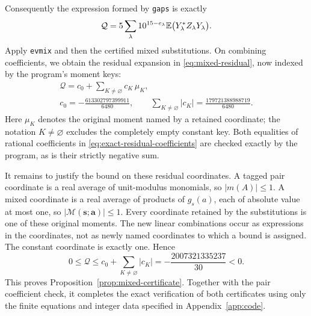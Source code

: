 Consequently the expression formed by \texttt{gaps} is exactly
\[
 \mathcal Q=
 5\sum_\lambda 10^{15-e_\lambda}
       \mathbb E\bigl(Y_\lambda^*Z_\lambda Y_\lambda\bigr).
\]
Apply \texttt{evmix} and then the certified mixed substitutions.  On
combining coefficients, we obtain the residual expansion in
\eqref{eq:mixed-residual}, now indexed by the program's moment keys:
\begin{equation}
 \begin{gathered}
 \mathcal Q=c_0+\sum_{K\ne\varnothing}c_K\,\mu_K,\\
 c_0=-\frac{613302797399911}{6480},\qquad
 \sum_{K\ne\varnothing}|c_K|
     =\frac{179721388988719}{6480}.
 \end{gathered}
 \label{eq:exact-residual-coefficients}
\end{equation}
Here $\mu_K$ denotes the original moment named by a retained coordinate;
the notation $K\ne\varnothing$ excludes the completely empty constant
key.  Both equalities of rational coefficients in
\eqref{eq:exact-residual-coefficients} are checked exactly by the
program, as is their strictly negative sum.

It remains to justify the bound on these residual coordinates.  A
tagged pair coordinate is a real average of unit-modulus monomials, so
$|m(A)|\le1$.  A mixed coordinate is a real average of products of
$g_s(a)$, each of absolute value at most one, so
$|\mathcal M(\mathbf s;\mathbf a)|\le1$.  Every coordinate retained by
the substitutions is one of these original moments.  The new linear
combinations occur as expressions in the coordinates, not as newly
named coordinates to which a bound is assigned.  The constant
coordinate is exactly one.  Hence
\[
 0\le\mathcal Q
 \le c_0+\sum_{K\ne\varnothing}|c_K|
 =-\frac{2007321335237}{30}<0.
\]
This proves Proposition~\ref{prop:mixed-certificate}.  Together with
the pair coefficient check, it completes the exact verification of
both certificates using only the finite equations and integer data
specified in Appendix~\ref{app:code}.
